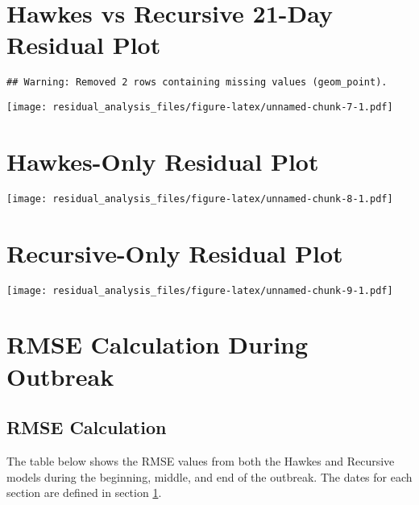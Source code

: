 \documentclass[
]{article}
\begin{document}
\pagebreak

\hypertarget{hawkes-vs-recursive-21-day-residual-plot}{%
\section{Hawkes vs Recursive 21-Day Residual
Plot}\label{hawkes-vs-recursive-21-day-residual-plot}}

\begin{verbatim}
## Warning: Removed 2 rows containing missing values (geom_point).
\end{verbatim}

\texttt{[image: residual\_analysis\_files/figure-latex/unnamed-chunk-7-1.pdf]}

\pagebreak

\hypertarget{hawkes-only-residual-plot}{%
\section{Hawkes-Only Residual Plot}\label{hawkes-only-residual-plot}}

\texttt{[image: residual\_analysis\_files/figure-latex/unnamed-chunk-8-1.pdf]}

\pagebreak

\hypertarget{recursive-only-residual-plot}{%
\section{Recursive-Only Residual
Plot}\label{recursive-only-residual-plot}}

\texttt{[image: residual\_analysis\_files/figure-latex/unnamed-chunk-9-1.pdf]}

\pagebreak

\hypertarget{rmse-calculation-during-outbreak}{%
\section{RMSE Calculation During
Outbreak}\label{rmse-calculation-during-outbreak}}

\hypertarget{rmse-calculation}{%
\subsection{RMSE Calculation}\label{rmse-calculation}}

The table below shows the RMSE values from both the Hawkes and Recursive
models during the beginning, middle, and end of the outbreak. The dates
for each section are defined in section \protect\hyperlink{setup}{1}.
\end{document}
